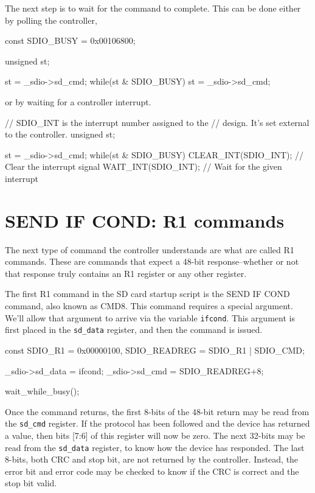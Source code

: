 \documentclass{gqtekspec}
\begin{document}
The next step is to wait for the command to complete.  This can be done either
by polling the controller,
\begin{zCpp}
	const	SDIO_BUSY    = 0x00106800;

	unsigned	st;

	st = _sdio->sd_cmd;
	while(st & SDIO_BUSY)
		st = _sdio->sd_cmd;
\end{zCpp}
or by waiting for a controller interrupt.
\begin{zCpp}
	// SDIO_INT is the interrupt number assigned to the
	// design.  It's set external to the controller.
	unsigned	st;

	st = _sdio->sd_cmd;
	while(st & SDIO_BUSY) {
		CLEAR_INT(SDIO_INT);	// Clear the interrupt signal
		WAIT_INT(SDIO_INT);	// Wait for the given interrupt
	}
\end{zCpp}

\section{SEND IF COND: R1 commands}
The next type of command the controller understands are what are called
R1 commands.  These are commands that expect a 48-bit response--whether
or not that response truly contains an R1 register or any other register.

The first R1 command in the SD card startup script is the SEND IF COND command,
also known as CMD8.  This command requires a special argument.  We'll allow
that argument to arrive via the variable {\tt ifcond}.  This argument is first
placed in the {\tt sd\_data} register, and then the command is issued.

\begin{zCpp}
	const	SDIO_R1      = 0x00000100,
		SDIO_READREG = SDIO_R1 | SDIO_CMD;

	_sdio->sd_data = ifcond;
	_sdio->sd_cmd = SDIO_READREG+8;

	wait_while_busy();
\end{zCpp}

Once the command returns, the first 8-bits of the 48-bit return may be
read from the {\tt sd\_cmd} register.  If the protocol has been followed and
the device has returned a value, then bits [7:6] of this register will now
be zero.  The next 32-bits may be read from the {\tt sd\_data} register, to
know how the device has responded.  The last 8-bits, both CRC and stop bit,
are not returned by the controller.  Instead, the error bit and error code may
be checked to know if the CRC is correct and the stop bit valid.
\end{document}
